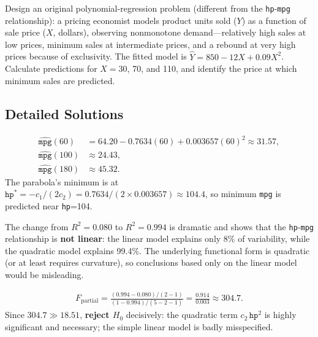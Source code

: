 \begin{problema}
\label{prob:bc664de}
Design an original polynomial-regression problem (different from the \texttt{hp}-\texttt{mpg} relationship): a pricing economist models product units sold ($Y$) as a function of sale price ($X$, dollars), observing nonmonotone demand—relatively high sales at low prices, minimum sales at intermediate prices, and a rebound at very high prices because of exclusivity. The fitted model is $\hat Y=850-12X+0.09X^2$. Calculate predictions for $X=30$, 70, and 110, and identify the price at which minimum sales are predicted.
\end{problema}

\subsection*{Detailed Solutions}

\begin{solproblema}[prob:85eb17b]
\begin{align}
\hat{\texttt{mpg}}(60)&=64.20-0.7634(60)+0.003657(60)^2\approx31.57,\\
\hat{\texttt{mpg}}(100)&\approx24.43,\\
\hat{\texttt{mpg}}(180)&\approx45.32.
\end{align}
The parabola's minimum is at $\texttt{hp}^*=-c_1/(2c_2)=0.7634/(2\times0.003657)\approx104.4$, so minimum \texttt{mpg} is predicted near \texttt{hp}=104.
\end{solproblema}

\begin{solproblema}
The change from $R^2=0.080$ to $R^2=0.994$ is dramatic and shows that the \texttt{hp}-\texttt{mpg} relationship is \textbf{not linear}: the linear model explains only 8\% of variability, while the quadratic model explains 99.4\%. The underlying functional form is quadratic (or at least requires curvature), so conclusions based only on the linear model would be misleading.
\end{solproblema}

\begin{solproblema}
\begin{align}
F_{\text{partial}}=\frac{(0.994-0.080)/(2-1)}{(1-0.994)/(5-2-1)}=\frac{0.914}{0.003}\approx304.7.
\end{align}
Since $304.7\gg18.51$, \textbf{reject $H_0$} decisively: the quadratic term $c_2\,\texttt{hp}^2$ is highly significant and necessary; the simple linear model is badly misspecified.
\end{solproblema}

